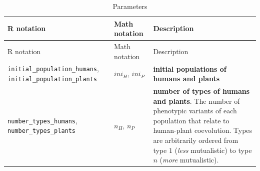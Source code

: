 \documentclass[
]{book}
\begin{document}
\begin{longtable}[]{@{}lll@{}}
\caption{Parameters}\tabularnewline
\toprule
\begin{minipage}[b]{0.27\columnwidth}\raggedright
R notation\strut
\end{minipage} & \begin{minipage}[b]{0.25\columnwidth}\raggedright
Math notation\strut
\end{minipage} & \begin{minipage}[b]{0.40\columnwidth}\raggedright
Description\strut
\end{minipage}\tabularnewline
\midrule
\endfirsthead
\toprule
\begin{minipage}[b]{0.27\columnwidth}\raggedright
R notation\strut
\end{minipage} & \begin{minipage}[b]{0.25\columnwidth}\raggedright
Math notation\strut
\end{minipage} & \begin{minipage}[b]{0.40\columnwidth}\raggedright
Description\strut
\end{minipage}\tabularnewline
\midrule
\endhead
\begin{minipage}[t]{0.27\columnwidth}\raggedright
\texttt{initial\_population\_humans}, \texttt{initial\_population\_plants}\strut
\end{minipage} & \begin{minipage}[t]{0.25\columnwidth}\raggedright
\(ini_{H},\,ini_{P}\)\strut
\end{minipage} & \begin{minipage}[t]{0.40\columnwidth}\raggedright
\textbf{initial populations of humans and plants}\strut
\end{minipage}\tabularnewline
\begin{minipage}[t]{0.27\columnwidth}\raggedright
\texttt{number\_types\_humans}, \texttt{number\_types\_plants}\strut
\end{minipage} & \begin{minipage}[t]{0.25\columnwidth}\raggedright
\(n_{H},\,n_{P}\)\strut
\end{minipage} & \begin{minipage}[t]{0.40\columnwidth}\raggedright
\textbf{number of types of humans and plants}. The number of phenotypic variants of each population that relate to human-plant coevolution. Types are arbitrarily ordered from type \(1\) (\emph{less} mutualistic) to type \(n\) (\emph{more} mutualistic).\strut
\end{minipage}\tabularnewline

\end{longtable}
\end{document}
